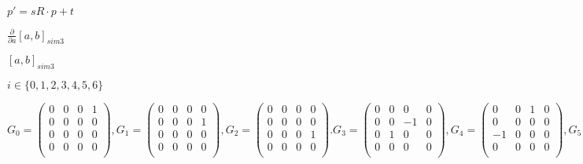 \documentclass{article}
\begin{document}
$ p' = sR\cdot p + t $
\pagebreak

$ \frac{\partial}{\partial a} [a, b]_{sim3} $
\pagebreak

$ [a, b]_{sim3} $
\pagebreak

$ i \in \{0,1,2,3,4,5,6\} $
\pagebreak

\[ G_0 = \left( \begin{array}{cccc} 0& 0& 0& 1\\ 0& 0& 0& 0\\ 0& 0& 0& 0\\ 0& 0& 0& 0\\ \end{array} \right), G_1 = \left( \begin{array}{cccc} 0& 0& 0& 0\\ 0& 0& 0& 1\\ 0& 0& 0& 0\\ 0& 0& 0& 0\\ \end{array} \right), G_2 = \left( \begin{array}{cccc} 0& 0& 0& 0\\ 0& 0& 0& 0\\ 0& 0& 0& 1\\ 0& 0& 0& 0\\ \end{array} \right). G_3 = \left( \begin{array}{cccc} 0& 0& 0& 0\\ 0& 0& -1& 0\\ 0& 1& 0& 0\\ 0& 0& 0& 0\\ \end{array} \right), G_4 = \left( \begin{array}{cccc} 0& 0& 1& 0\\ 0& 0& 0& 0\\ -1& 0& 0& 0\\ 0& 0& 0& 0\\ \end{array} \right), G_5 = \left( \begin{array}{cccc} 0& -1& 0& 0\\ 1& 0& 0& 0\\ 0& 0& 0& 0\\ 0& 0& 0& 0\\ \end{array} \right), G_6 = \left( \begin{array}{cccc} 1& 0& 0& 0\\ 0& 1& 0& 0\\ 0& 0& 1& 0\\ 0& 0& 0& 0\\ \end{array} \right). \]
\pagebreak
\end{document}
